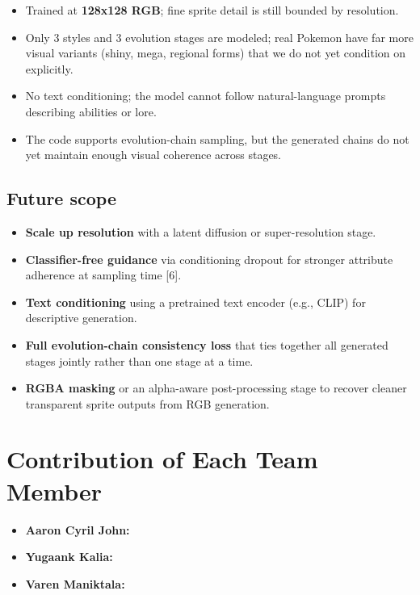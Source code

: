 \documentclass[
]{article}
\providecommand{\tightlist}{%
  \setlength{\itemsep}{0pt}\setlength{\parskip}{0pt}}
\begin{document}
\begin{itemize}
\tightlist
\item
  Trained at \textbf{128x128 RGB}; fine sprite detail is still bounded by
  resolution.
\item
  Only 3 styles and 3 evolution stages are modeled; real Pokemon have
  far more visual variants (shiny, mega, regional forms) that we do not
  yet condition on explicitly.
\item
  No text conditioning; the model cannot follow natural-language prompts
  describing abilities or lore.
\item
  The code supports evolution-chain sampling, but the generated chains
  do not yet maintain enough visual coherence across stages.
\end{itemize}

\subsection{Future scope}\label{future-scope}

\begin{itemize}
\tightlist
\item
  \textbf{Scale up resolution} with a latent diffusion or
  super-resolution stage.
\item
  \textbf{Classifier-free guidance} via conditioning dropout for
  stronger attribute adherence at sampling time {[}6{]}.
\item
  \textbf{Text conditioning} using a pretrained text encoder (e.g.,
  CLIP) for descriptive generation.
\item
  \textbf{Full evolution-chain consistency loss} that ties together all
  generated stages jointly rather than one stage at a time.
\item
  \textbf{RGBA masking} or an alpha-aware post-processing stage to
  recover cleaner transparent sprite outputs from RGB generation.
\end{itemize}

\section{Contribution of Each Team
Member}\label{contribution-of-each-team-member}

\begin{itemize}
\tightlist
\item
  \textbf{Aaron Cyril John:} 
\item
  \textbf{Yugaank Kalia:} 
\item
  \textbf{Varen Maniktala:} 
\end{itemize}
\end{document}
